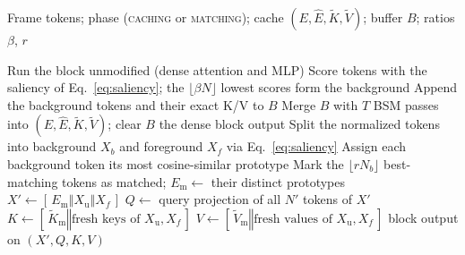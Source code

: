 %

\begin{algorithm}[t]
\caption{Standalone TempoMem (one block, one frame)}
\label{alg:standalone}
\begin{algorithmic}[1]
\Require
  Frame tokens; phase (\textsc{caching} or \textsc{matching});
  cache $(E, \hat E, \tilde K, \tilde V)$; buffer $B$;
  ratios $\beta$, $r$
  \vspace{0.3em}

  \State Run the block unmodified (dense attention and MLP)
  \State Score tokens with the saliency of Eq.~\ref{eq:saliency};
    the $\lfloor \beta N \rfloor$ lowest scores form the background
  \State Append the background tokens and their exact K/V to $B$
    \State Merge $B$ with $T$ BSM passes into
      $(E, \hat E, \tilde K, \tilde V)$; clear $B$
  \EndIf
  \State \Return the dense block output
\Else
  \State Split the normalized tokens into background $X_b$ and
    foreground $X_f$ via Eq.~\ref{eq:saliency}
  \State Assign each background token its most cosine-similar prototype
  \State Mark the $\lfloor r N_b \rfloor$ best-matching tokens as matched;
    $E_{\mathrm{m}} \gets$ their distinct prototypes
  \State $X' \gets [\,E_{\mathrm{m}} \mathbin{\Vert} X_{\mathrm{u}}
    \mathbin{\Vert} X_f\,]$
    \hfill{}
  \State $Q \gets$ query projection of all $N'$ tokens of $X'$
  \State $K \gets [\,\tilde K_{\mathrm{m}} \mathbin{\Vert}
    \text{fresh keys of } X_{\mathrm{u}}, X_f\,]$
    \hfill{}
  \State $V \gets [\,\tilde V_{\mathrm{m}} \mathbin{\Vert}
    \text{fresh values of } X_{\mathrm{u}}, X_f\,]$
  \State \Return block output on $(X', Q, K, V)$
    \hfill{}
\EndIf
\end{algorithmic}
\end{algorithm}

